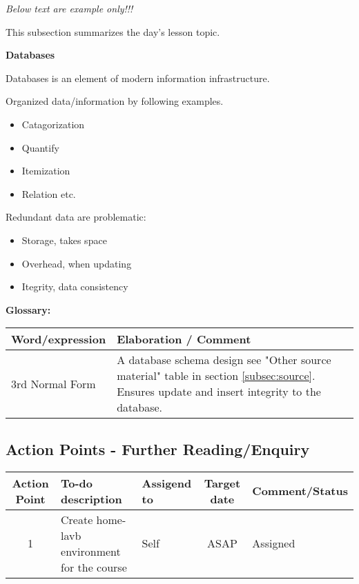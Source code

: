 {\emph{Below text are example only!!!}}


This subsection summarizes the day's lesson topic.

{\bfseries{Databases}}


Databases is an element of modern information infrastructure.


Organized data/information by following examples.


\begin{itemize}
    \item Catagorization
    \item Quantify
    \item Itemization
    \item Relation etc.
\end{itemize}


Redundant data are problematic:
\begin{itemize}
    \item Storage, takes space
    \item Overhead, when updating
    \item Itegrity, data consistency
\end{itemize}


{\bfseries{Glossary:}}


\begin{tabular}{p{40mm} | p{100mm}}
    Word/expression & Elaboration / Comment \\ \hline
    3rd Normal Form & A database schema design see "Other source material" table in section \ref{subsec:source}. Ensures update and insert integrity to the database.\\ \hline
\end{tabular}



\subsection{Action Points - Further Reading/Enquiry}

\begin{adjustbox}{max width=\textwidth}
\begin{tabular}{c|l|l|c|l}
    Action Point & To-do description & Assigend to & Target date & Comment/Status \\
    \hline
    1 & Create home-lavb environment for the course & Self & ASAP & Assigned \\
\end{tabular}
\end{adjustbox}


